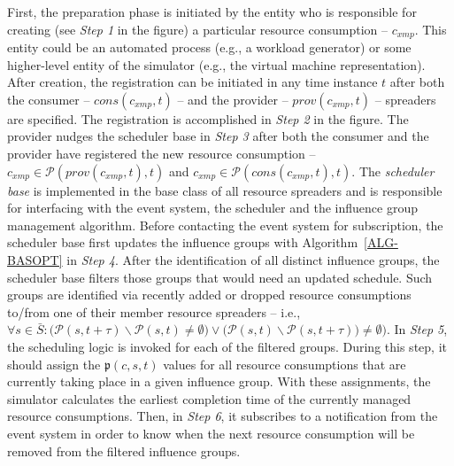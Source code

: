 \documentclass[sort, compress, 5p]{elsarticle}
\newcommand{\SMALLESTIMEGRANULARITYM}{\tau}
\begin{document}
First, the preparation phase is initiated by the entity who is responsible for creating (see \emph{Step 1} in the figure) a particular resource consumption -- $c_{xmp}$. This entity could be an automated process (e.g., a workload generator) or some higher-level entity of the simulator (e.g., the virtual machine representation). After creation, the registration can be initiated in any time instance $t$ after both the consumer -- $cons(c_{xmp},t)$ -- and the provider -- $prov(c_{xmp},t)$ -- spreaders are specified. The registration is accomplished in \emph{Step 2} in the figure. The provider nudges the scheduler base in \emph{Step 3} after both the consumer and the provider have registered the new resource consumption -- $c_{xmp}\in \mathcal{P}(prov(c_{xmp},t),t)$ and $c_{xmp}\in \mathcal{P}(cons(c_{xmp},t),t)$. The \emph{scheduler base} is implemented in the base class of all resource spreaders and is responsible for interfacing with the event system, the scheduler and the influence group management algorithm. Before contacting the event system for subscription, the scheduler base first updates the influence groups with Algorithm~\ref{ALG-BASOPT} in \emph{Step 4}. After the identification of all distinct influence groups, the scheduler base filters those groups that would need an updated schedule. Such groups are identified via recently added or dropped resource consumptions to/from one of their member resource spreaders -- i.e., $\forall s\in \bar{S}: \big(\mathcal{P}(s,t+\SMALLESTIMEGRANULARITYM) \backslash \mathcal{P}(s,t)\neq\emptyset\big)\lor\big(\mathcal{P}(s,t)\backslash \mathcal{P}(s,t+\SMALLESTIMEGRANULARITYM))\neq\emptyset\big)$. In \emph{Step 5}, the scheduling logic is invoked for each of the filtered groups. During this step, it should assign the $\mathfrak{p}(c,s,t)$ values for all resource consumptions that are currently taking place in a given influence group. With these assignments, the simulator calculates the earliest completion time of the currently managed resource consumptions. Then, in \emph{Step 6}, it subscribes to a notification from the event system in order to know when the next resource consumption will be removed from the filtered influence groups.
\end{document}
